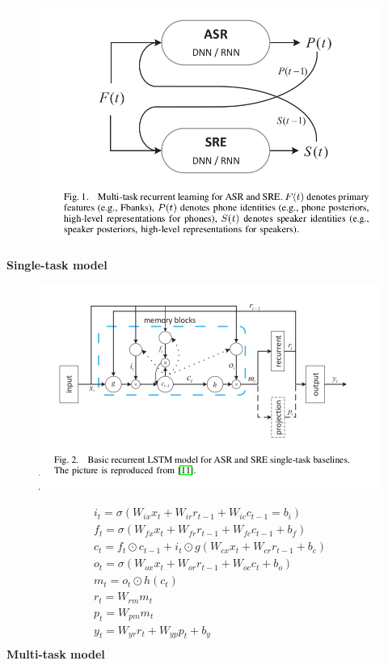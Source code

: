 \documentclass{article}
\begin{document}
	\begin{figure}[H]
		\centering
		\includegraphics[width=0.75\linewidth]{images/multi-task-recurrent-learning.png}
		\label{fig:writing-thesis}
	\end{figure}
	\textbf{Single-task model}
	\begin{figure}[H]
		\centering
		\includegraphics[width=0.75\linewidth]{images/basis-single-task-model.png}
		\label{fig:writing-thesis}
	\end{figure}
	\begin{gather*}
		i_t = \sigma(W_{ix}x_t + W_{ir}r_{t-1} + W_{ic}c_{t-1}=b_i)\\
		f_t = \sigma(W_{fx}x_t + W_{fr}r_{t-1} + W_{fc}c_{t-1}+b_f)\\
		c_t = f_t \odot c_{t-1} + i_t \odot g(W_{cx}x_t + W_{cr}r_{t-1} + b_c)\\
		o_t = \sigma(W_{ox}x_t + W_{or}r_{t-1} + W_{oc}c_t + b_o)\\
		m_t = o_t \odot h(c_t)\\
		r_t = W_{rm}m_t\\
		p_t = W_{pm}m_t\\
		y_t = W_{yr}r_t + W_{yp}p_t + b_y\\
	\end{gather*}
	\textbf{Multi-task model}
\end{document}
